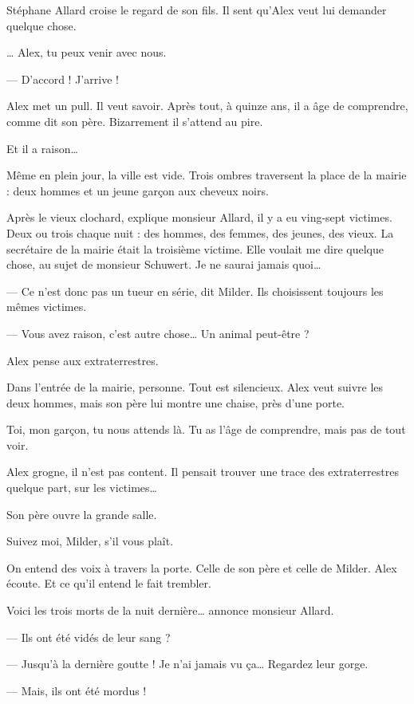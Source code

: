 Stéphane Allard croise le regard de son fils. Il sent qu'Alex veut lui demander quelque chose.

\og \ldots{} Alex, tu peux venir avec nous.

--- D'accord ! J'arrive ! \fg{}

Alex met un pull. Il veut savoir. Après tout, à quinze ans, il a âge de comprendre, comme dit son père. Bizarrement il s'attend au
pire.

Et il a raison\ldots{}

Même en plein jour, la ville est vide. Trois ombres traversent la place de la mairie : deux hommes et un jeune gar\c{c}on aux
cheveux noirs.

\og Après le vieux clochard, explique monsieur Allard, il y a eu ving-sept victimes. Deux ou trois chaque nuit : des hommes, des
femmes, des jeunes, des vieux. La secrétaire de la mairie était la troisième victime. Elle voulait me dire quelque chose, au sujet
de monsieur Schuwert. Je ne saurai jamais quoi\ldots{}

--- Ce n'est donc pas un tueur en série, dit Milder. Ils choisissent toujours les mêmes victimes.

--- Vous avez raison, c'est autre chose\ldots{} Un animal peut-être ? \fg{}

Alex pense aux extraterrestres.

Dans l'entrée de la mairie, personne. Tout est silencieux. Alex veut suivre les deux hommes, mais son père lui montre une chaise,
près d'une porte.

\og Toi, mon gar\c{c}on, tu nous attends là. Tu as l'âge de comprendre, mais pas de tout voir. \fg{}

Alex grogne, il n'est pas content. Il pensait trouver une trace des extraterrestres quelque part, sur les victimes\ldots{}

Son père ouvre la grande salle.

\og Suivez moi, Milder, s'il vous plaît. \fg{}

On entend des voix à travers la porte. Celle de son père et celle de Milder. Alex écoute. Et ce qu'il entend le fait trembler.

\og Voici les trois morts de la nuit dernière\ldots{} annonce monsieur Allard.

--- Ils ont été vidés de leur sang ?

--- Jusqu'à la dernière goutte ! Je n'ai jamais vu \c{c}a\ldots{} Regardez leur gorge.

--- Mais, ils ont été mordus !

